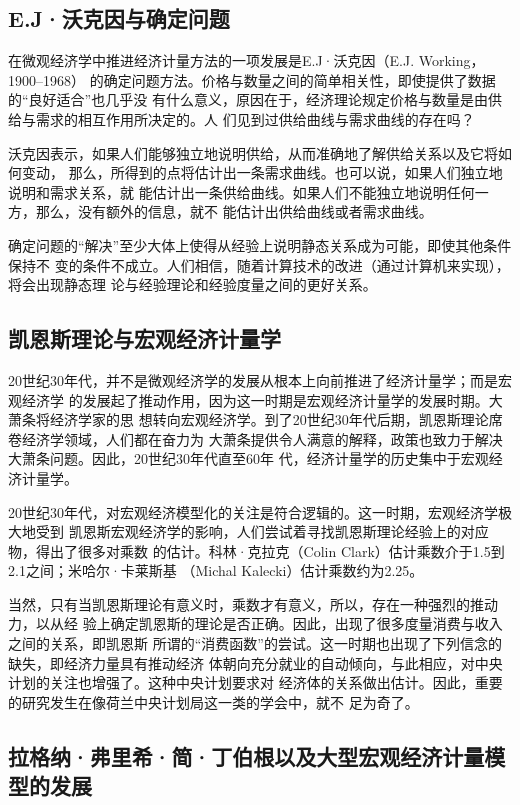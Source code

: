\subsection{E.J·沃克因与确定问题}

在微观经济学中推进经济计量方法的一项发展是E.J·沃克因（E.J. Working，1900--1968）
的确定问题方法。价格与数量之间的简单相关性，即使提供了数据的“良好适合”也几乎没
有什么意义，原因在于，经济理论规定价格与数量是由供给与需求的相互作用所决定的。人
们见到过供给曲线与需求曲线的存在吗？

沃克因表示，如果人们能够独立地说明供给，从而准确地了解供给关系以及它将如何变动，
那么，所得到的点将估计出一条需求曲线。也可以说，如果人们独立地说明和需求关系，就
能估计出一条供给曲线。如果人们不能独立地说明任何一方，那么，没有额外的信息，就不
能估计出供给曲线或者需求曲线。

确定问题的“解决”至少大体上使得从经验上说明静态关系成为可能，即使其他条件保持不
变的条件不成立。人们相信，随着计算技术的改进（通过计算机来实现），将会出现静态理
论与经验理论和经验度量之间的更好关系。

\subsection{凯恩斯理论与宏观经济计量学}

20世纪30年代，并不是微观经济学的发展从根本上向前推进了经济计量学；而是宏观经济学
的发展起了推动作用，因为这一时期是宏观经济计量学的发展时期。大萧条将经济学家的思
想转向宏观经济学。到了20世纪30年代后期，凯恩斯理论席卷经济学领域，人们都在奋力为
大萧条提供令人满意的解释，政策也致力于解决大萧条问题。因此，20世纪30年代直至60年
代，经济计量学的历史集中于宏观经济计量学。

20世纪30年代，对宏观经济模型化的关注是符合逻辑的。这一时期，宏观经济学极大地受到
凯恩斯宏观经济学的影响，人们尝试着寻找凯恩斯理论经验上的对应物，得出了很多对乘数
的估计。科林·克拉克（Colin Clark）估计乘数介于1.5到2.1之间；米哈尔·卡莱斯基
（Michal Kalecki）估计乘数约为2.25。

当然，只有当凯恩斯理论有意义时，乘数才有意义，所以，存在一种强烈的推动力，以从经
验上确定凯恩斯的理论是否正确。因此，出现了很多度量消费与收入之间的关系，即凯恩斯
所谓的“消费函数”的尝试。这一时期也出现了下列信念的缺失，即经济力量具有推动经济
体朝向充分就业的自动倾向，与此相应，对中央计划的关注也增强了。这种中央计划要求对
经济体的关系做出估计。因此，重要的研究发生在像荷兰中央计划局这一类的学会中，就不
足为奇了。

\subsection{拉格纳·弗里希·简·丁伯根以及大型宏观经济计量模型的发展}

